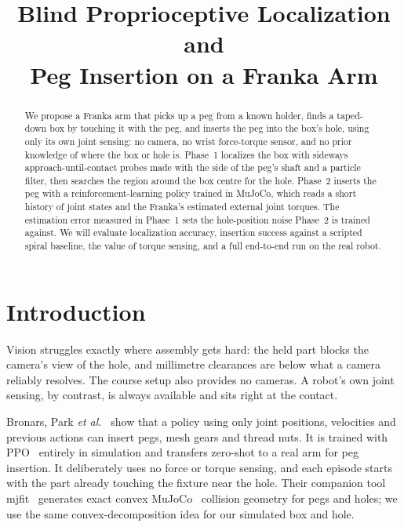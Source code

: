 \documentclass[conference]{IEEEtran}
\begin{document}
\title{Blind Proprioceptive Localization and\\Peg Insertion on a Franka Arm}

\author{
}

\maketitle

\begin{abstract}
We propose a Franka arm that picks up a peg from a known holder, finds a
taped-down box by touching it with the peg, and inserts the peg into the box's
hole, using only its own joint sensing: no camera, no wrist force-torque
sensor, and no prior knowledge of where the box or hole is. Phase~1 localizes
the box with sideways approach-until-contact probes made with the side of the
peg's shaft and a particle filter, then searches the region around the box
centre for the hole. Phase~2 inserts the peg with a reinforcement-learning policy trained
in MuJoCo, which reads a short history of joint states and the Franka's
estimated external joint torques. The estimation error measured in Phase~1 sets
the hole-position noise Phase~2 is trained against. We will evaluate
localization accuracy, insertion success against a scripted spiral baseline, the
value of torque sensing, and a full end-to-end run on the real robot.
\end{abstract}

\section{Introduction}

Vision struggles exactly where assembly gets hard: the held part blocks the
camera's view of the hole, and millimetre clearances are below what a camera
reliably resolves. The course setup also provides no cameras. A robot's own
joint sensing, by contrast, is always available and sits right at the contact.

Bronars, Park \emph{et al.}~\cite{bronars2026blind} show that a policy using
only joint positions, velocities and previous actions can insert pegs, mesh
gears and thread nuts. It is trained with PPO~\cite{schulman2017ppo} entirely
in simulation and transfers zero-shot to a real arm for peg insertion. It
deliberately uses no force or torque sensing, and each episode starts with the
part already touching the fixture near the hole. Their companion tool
mjfit~\cite{mjfit} generates exact convex MuJoCo~\cite{todorov2012mujoco}
collision geometry for pegs and holes; we use the same convex-decomposition
idea for our simulated box and hole.
\end{document}
